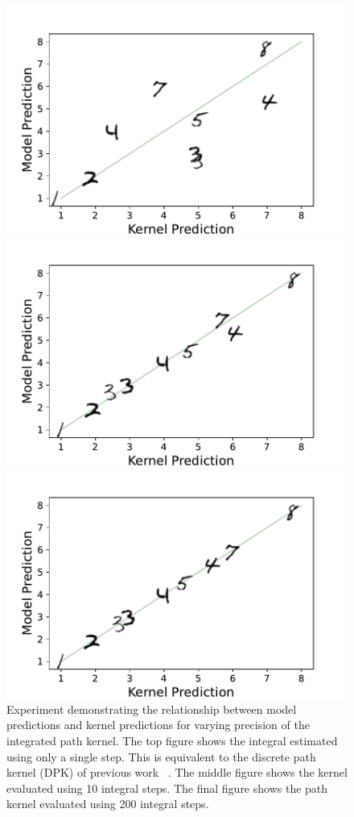 \begin{figure}[!h]
    \centering
    \includegraphics[width=0.55\linewidth]{c4_figures/mnist_model_kernel_compare_1_step.pdf}

    \vspace{-9mm}
    
    \includegraphics[width=0.55\linewidth]{c4_figures/mnist_model_kernel_compare_10_steps.pdf}
    
    \vspace{-9mm}
    
    \includegraphics[width=0.55\linewidth]{c4_figures/mnist_model_kernel_compare_200_steps.pdf}
    \caption{Experiment demonstrating the relationship between model predictions and kernel predictions for varying precision of the integrated path kernel. The top figure shows the integral estimated using only a single step. This is equivalent to the discrete path kernel (DPK) of previous work ~\citep{domingos2020every, chen2021equivalence}. The middle figure shows the kernel evaluated using 10 integral steps. The final figure shows the path kernel evaluated using 200 integral steps.}
    \label{fig:mnist}
\end{figure}
